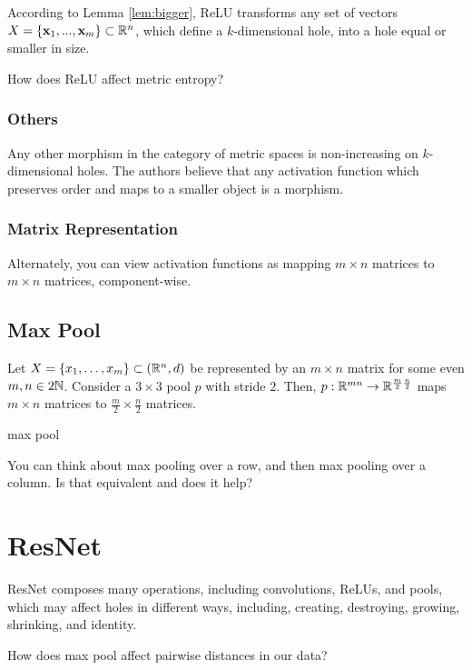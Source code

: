 According to Lemma \ref{lem:bigger}, ReLU transforms any set of vectors $X=\{\mathbf{x}_1,...,\mathbf{x}_m\}\subset \mathbb{R}^n$, which define a $k$-dimensional hole, into a hole equal or smaller in size.

\begin{question}
How does ReLU affect metric entropy?
\end{question}

\subsubsection{Others}
Any other morphism in the category of metric spaces is non-increasing on $k$-dimensional holes.
The authors believe that any activation function which preserves order and maps to a smaller object is a morphism.

\subsubsection{Matrix Representation}
Alternately, you can view activation functions as mapping $m\times n$ matrices to $m\times n$ matrices, component-wise.

\subsection{Max Pool}\label{sec:pool}
Let $X=\{x_1,\dots,x_m\}\subset(\mathbb{R}^n,d)$ be represented by an $m\times n$ matrix for some even $m,n\in 2\mathbb{N}$.
Consider a $3\times 3$ pool $p$ with stride $2$.
Then, $p:\mathbb{R}^{mn}\to\mathbb{R}^{\frac{m}{2}\frac{n}{2}}$ maps $m\times n$ matrices to $\frac{m}{2}\times\frac{n}{2}$ matrices.
\begin{definition}
max pool
\end{definition}

\begin{question}
You can think about max pooling over a row, and then max pooling over a column. Is that equivalent and does it help?
\end{question}


\section{ResNet}\label{sec:result}
ResNet composes many operations, including convolutions, ReLUs, and pools, which may affect holes in different ways, including, creating, destroying, growing, shrinking, and identity. 

\begin{question}
How does max pool affect pairwise distances in our data?
\end{question}

